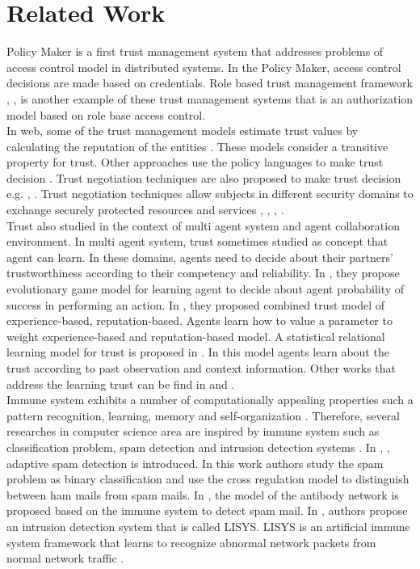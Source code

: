 \documentclass{llncs}
\begin{document}
\section{Related Work}
Policy Maker\cite{blaze} is a first trust management system that addresses problems of access control model in distributed systems.  In the Policy Maker, access control decisions are made based on credentials.  Role based trust management framework \cite{mitchell1}, \cite{mitchell}, \cite{mitchell3} is another example of these trust management systems that is an authorization model based on role base access control. \\
In web, some of the trust management models estimate trust values by calculating the reputation of the entities \cite{reputationWeb}. These models consider a transitive property for trust.  Other approaches  use the policy languages to make trust decision \cite{trustpolicy}.  Trust negotiation techniques are also proposed to make trust decision e.g. \cite{Winslett}, \cite{Winslett2}. Trust negotiation techniques allow subjects in different security domains to exchange securely protected resources and services \cite{Squicciarini}, \cite{Koshutanski}, \cite{Winsborough}, \cite{Winsborough2}. \\
Trust also studied in the context of multi agent system and agent collaboration environment. In multi agent system, trust sometimes studied as concept that agent can learn. In these domains, agents need to decide about their partners’ trustworthiness according to their competency and reliability.  In \cite{competent}, they propose evolutionary game model for learning agent
to decide about agent probability of success in performing an action. In \cite{experince}, they proposed combined trust model of experience-based, reputation-based. Agents learn how to value a parameter to weight experience-based and reputation-based model.  A statistical relational learning model for trust is proposed in \cite{statistical}. In this model agents learn about the trust according to past observation and context information. 
Other works that address the learning trust can be find in \cite{inittrust} and \cite{taskspecific}.\\
Immune system exhibits a number of computationally appealing properties such a pattern recognition, learning, memory and self-organization \cite{aisLearning}. Therefore, several researches in computer science area are inspired by immune system such as classification problem, spam detection and intrusion detection systems  \cite{Forrest1}.  In \cite{Al1}, \cite{Al2}, adaptive spam detection is introduced. In this work authors study the spam problem as binary classification and use the cross regulation model to distinguish between ham mails from spam mails. In \cite{spam}, the model of the antibody network is proposed based on the immune system to detect spam mail. In \cite{Forrest2},  authors propose  an intrusion detection system that is called LISYS.  LISYS is an artificial immune system framework that learns to recognize abnormal network packets from normal network traffic \cite{LISYS}.
\end{document}
